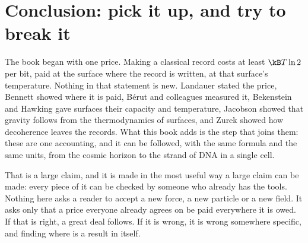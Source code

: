 \chapter{Conclusion: pick it up, and try to break it}\label{ch:conclusion}

The book began with one price. Making a classical record costs at least $\kB T\ln2$ per bit, paid at the surface where the record is written,
at that surface's temperature. Nothing in that statement is new. Landauer stated the price, Bennett showed where it is paid, B\'erut and
colleagues measured it, Bekenstein and Hawking gave surfaces their capacity and temperature, Jacobson showed that gravity follows from the
thermodynamics of surfaces, and Zurek showed how decoherence leaves the records. What this book adds is the step that joins them: these are one
accounting, and it can be followed, with the same formula and the same units, from the cosmic horizon to the strand of DNA in a single cell.

That is a large claim, and it is made in the most useful way a large claim can be made: every piece of it can be checked by someone who already
has the tools. Nothing here asks a reader to accept a new force, a new particle or a new field. It asks only that a price everyone already
agrees on be paid everywhere it is owed. If that is right, a great deal follows. If it is wrong, it is wrong somewhere specific, and finding where
is a result in itself.


